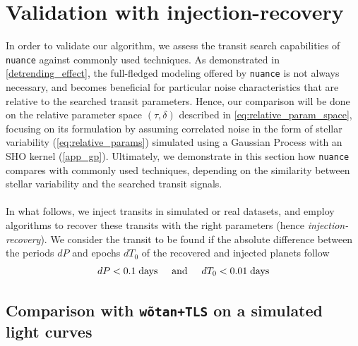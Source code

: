 \documentclass{aastex631}
\begin{document}
\newpage
\section{Validation with injection-recovery}\label{simu}
In order to validate our algorithm, we assess the transit search capabilities of \texttt{nuance} against commonly used techniques. As demonstrated in \autoref{detrending_effect}, the full-fledged modeling offered by \texttt{nuance} is not always necessary, and becomes beneficial for particular noise characteristics that are relative to the searched transit parameters. Hence, our comparison will be done on the relative parameter space $(\tau, \delta)$ described in \autoref{eq:relative_param_space}, focusing on its formulation by assuming correlated noise in the form of stellar variability (\autoref{eq:relative_params}) simulated using a Gaussian Process with an SHO kernel (\autoref{app_gp}). Ultimately, we demonstrate in this section how \texttt{nuance} compares with commonly used techniques, depending on the similarity between stellar variability and the searched transit signals.
\\\\
In what follows, we inject transits in simulated or real datasets, and employ algorithms to recover these transits with the right parameters (hence \textit{injection-recovery}). We consider the transit to be found if the absolute difference between the periods $dP$ and epochs $dT_0$ of the recovered and injected planets follow
$$dP<0.1\;\text{days} \hspace{0.5cm} \text{and} \hspace{0.5cm} dT_0<0.01\;\text{days}$$ 

\newcommand{\wtls}{\texttt{wõtan+TLS}}

\subsection{Comparison with \wtls{} on a simulated light curves}
\end{document}
